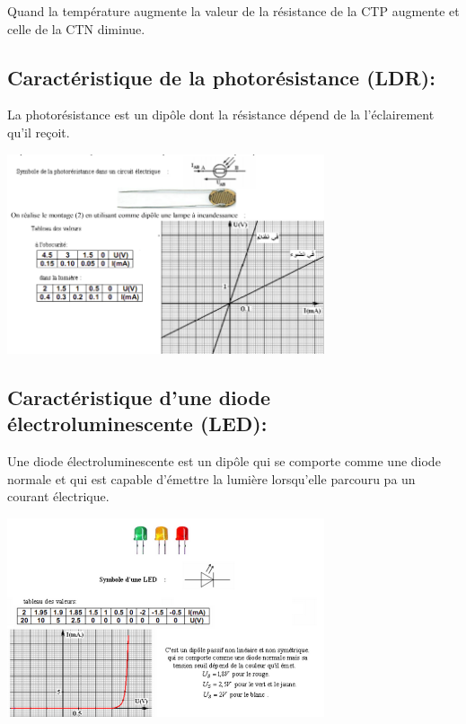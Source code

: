 \documentclass[12pt]{article}
\begin{document}
Quand la température augmente la valeur de la résistance de la CTP augmente et celle de la CTN diminue.
\subsection{Caractéristique de la photorésistance (LDR): }
La photorésistance est un dipôle dont la résistance dépend de la l'éclairement qu'il reçoit. 
\begin{center}
\includegraphics[width=0.7\textwidth]{./img/LDR.png}

\end{center}
\subsection{Caractéristique d'une diode électroluminescente (LED):}
Une diode électroluminescente est un dipôle qui se comporte comme une diode normale et qui est capable d’émettre
la lumière lorsqu'elle parcouru pa un courant électrique.
\begin{center}
  \includegraphics[width=0.7\textwidth]{./img/Led_teh.png}

\end{center}
\end{document}
